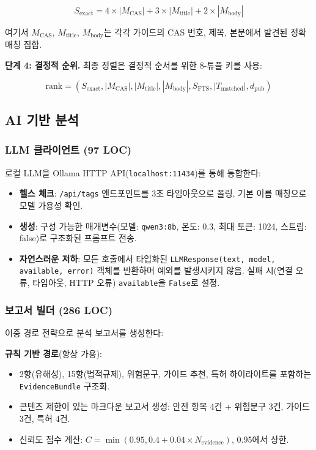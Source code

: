 \documentclass[preprint,12pt]{elsarticle}
\begin{document}
\begin{equation}
S_{\text{exact}} = 4 \times |M_{\text{CAS}}| + 3 \times |M_{\text{title}}| + 2 \times |M_{\text{body}}|
\end{equation}

여기서 $M_{\text{CAS}}$, $M_{\text{title}}$, $M_{\text{body}}$는 각각 가이드의 CAS 번호, 제목, 본문에서 발견된 정확 매칭 집합.

\textbf{단계 4: 결정적 순위.} 최종 정렬은 결정적 순서를 위한 8-튜플 키를 사용:

\begin{equation}
\text{rank} = (S_{\text{exact}}, |M_{\text{CAS}}|, |M_{\text{title}}|, |M_{\text{body}}|, S_{\text{FTS}}, |T_{\text{matched}}|, d_{\text{pub}})
\end{equation}

\subsection{AI 기반 분석}
\label{sec:ai}

\subsubsection{LLM 클라이언트 (97 LOC)}

로컬 LLM을 Ollama HTTP API(\texttt{localhost:11434})를 통해 통합한다:

\begin{itemize}
  \item \textbf{헬스 체크}: \texttt{/api/tags} 엔드포인트를 3초 타임아웃으로 폴링, 기본 이름 매칭으로 모델 가용성 확인.
  \item \textbf{생성}: 구성 가능한 매개변수(모델: \texttt{qwen3:8b}, 온도: 0.3, 최대 토큰: 1024, 스트림: false)로 구조화된 프롬프트 전송.
  \item \textbf{자연스러운 저하}: 모든 호출에서 타입화된 \texttt{LLMResponse(text, model, available, error)} 객체를 반환하며 예외를 발생시키지 않음. 실패 시(연결 오류, 타임아웃, HTTP 오류) \texttt{available}을 \texttt{False}로 설정.
\end{itemize}

\subsubsection{보고서 빌더 (286 LOC)}

이중 경로 전략으로 분석 보고서를 생성한다:

\textbf{규칙 기반 경로}(항상 가용):
\begin{itemize}
  \item 2항(유해성), 15항(법적규제), 위험문구, 가이드 추천, 특허 하이라이트를 포함하는 \texttt{EvidenceBundle} 구조화.
  \item 콘텐츠 제한이 있는 마크다운 보고서 생성: 안전 항목 4건 + 위험문구 3건, 가이드 3건, 특허 4건.
  \item 신뢰도 점수 계산: $C = \min(0.95, 0.4 + 0.04 \times N_{\text{evidence}})$, 0.95에서 상한.
\end{itemize}
\end{document}
